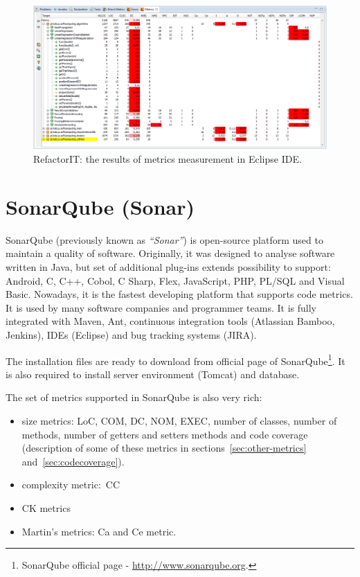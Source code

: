 \begin{figure}[h!]
	\centering
	\includegraphics[scale=0.45]{img/refactorit2.png}  
	\caption{RefactorIT: the results of metrics measurement in Eclipse IDE.}		
	\label{fig:refactor2}
\end{figure}

\section{SonarQube (Sonar)}
SonarQube (previously known as \textit{``Sonar''}) is open-source platform used to maintain a quality of software. Originally, it was designed to analyse software written in Java, but set of additional plug-ins extends possibility to support: Android, C, C++, Cobol, C Sharp, Flex, JavaScript, PHP, PL/SQL and Visual Basic. Nowadays, it is the fastest developing platform that supports code metrics. It is used by many software companies and programmer teams. It is fully integrated with Maven, Ant, continuous integration tools (Atlassian Bamboo, Jenkins), IDEs (Eclipse) and bug tracking systems (JIRA).    

The installation files are ready to download from official page of SonarQube\footnote{SonarQube official page - \url{http://www.sonarqube.org}.}. It is also required to install server environment (Tomcat) and database. 

The set of metrics supported in SonarQube is also very rich:

\begin{itemize}
\item size metrics:  \ac{LoC}, \ac{COM}, \ac{DC}, \ac{NOM}, \ac{EXEC}, number of classes,  number of methods, number of getters and setters methods and code coverage (description of some of these metrics in sections~\ref{sec:other-metrics} and~\ref{sec:codecoverage}).
\item complexity metric:~\ac{CC}
\item \ac{CK metrics}
\item Martin's metrics: \ac{Ca} and \ac{Ce} metric.
\end{itemize}

